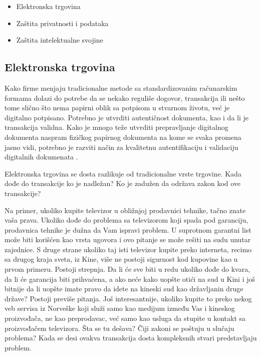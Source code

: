 \documentclass[a4paper]{article}
\begin{document}
{\begin{itemize}
\item{Elektronska trgovina}
\item{Zaštita privatnosti i podataka}
\item{Zaštita intelektualne svojine}
\end{itemize}

\subsection{Elektronska trgovina}

Kako firme menjaju tradicionalne metode sa standardizovanim ra\-ču\-na\-rskim formama dolazi do potrebe da se nekako reguliše dogovor, transakcija ili nešto tome slično što nema papirni oblik sa potpisom u stvarnom životu, već je digitalno potpisano. Potrebno je utvrditi autentičnost dokumenta, kao i da li je transakcija validna. Kako je mnogo teže utvrditi prepravljanje digitalnog dokumenta naspram fizičkog papirnog dokumenta na kome se svaka promena jasno vidi, potrebno je razviti način za kvalitetnu autentifikaciju i validaciju digitalnih dokumenata \cite{Legal_issues}.

Elektronska trgovina se dosta razlikuje od tradicionalne vrste trgovine. Kada dođe do transakcije ko je nadležan? Ko je zadužen da održava zakon kod ove transakcije?

Na primer, ukoliko kupite televizor u obližnjoj prodavnici tehnike, tačno znate vaša prava. Ukoliko dođe do problema sa televizorom koji spada pod garanciju, prodavnica tehnike je dužna da Vam ispravi problem. U suprotnom garantni list može biti korišćen kao vrsta ugovora i ovo pitanje se može rešiti na sudu unutar zajednice. S druge strane ukoliko taj isti televizor kupite preko interneta, recimo sa drugog kraja sveta, iz Kine, više ne postoji sigurnost kod kupovine kao u prvom primeru. Postoji strepnja. Da li će sve biti u redu ukoliko dođe do kvara, da li će garancija biti prihvaćena, a ako neće kako uopšte otići na sud u Kini i još bitnije da li uopšte imate pravo da idete na kineski sud kao državljanin druge države? Postoji previše pitanja. Još interesantnije, ukoliko kupite to preko nekog veb servisa iz Norveške koji služi samo kao medijum između Vas i kineskog proizvođača, ne kao preprodavac, već samo kao usluga da stupite u kontakt sa proizvođačem televizora. Šta se tu dešava? Čiji zakoni se poštuju u slučaju problema? Kada se desi ovakva transakcija dosta kompleksnih stvari predstavljaju problem.

}
\end{document}
